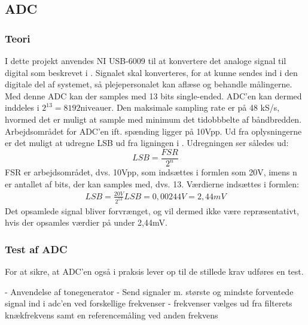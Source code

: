 \subsection{ADC}

\subsubsection{Teori}
I dette projekt anvendes NI USB-6009 til at konvertere det analoge signal til digital som beskrevet i . Signalet skal konverteres, for at kunne sendes ind i den digitale del af systemet, så plejepersonalet kan aflæse og behandle målingerne. Med denne ADC kan der samples med 13 bits single-ended. ADC'en kan dermed inddeles i $2^{13} = 8192 \text{niveauer}$. Den maksimale sampling rate er på 48 kS/s, hvormed det er muligt at sample med minimum det tidobbbelte af båndbredden. Arbejdsområdet for ADC'en ift. spænding ligger på 10Vpp. \cite{Instruments2014} Ud fra oplysningerne er det muligt at udregne LSB ud fra ligningen i . Udregningen ser således ud: \\
\begin{equation}
	LSB = \frac{FSR}{2^{n}} 
\end{equation}  
FSR er arbejdsområdet, dvs. 10Vpp, som indsættes i formlen som 20V, imens n er antallet af bits, der kan samples med, dvs. 13.
Værdierne indsættes i formlen: \\
\begin{align}
	LSB = \frac{20V}{2^{13}}
	LSB = 0,00244V = 2,44mV
\end{align}
Det opsamlede signal bliver forvrænget, og vil dermed ikke være repræsentativt, hvis der opsamles værdier på under 2,44mV. 

\subsubsection{Test af ADC}
For at sikre, at ADC'en også i praksis lever op til de stillede krav udføres en test.

- Anvendelse af tonegenerator
- Send signaler m. største og mindste forventede signal ind i adc'en ved forskellige frekvenser - frekvenser vælges ud fra filterets knækfrekvens samt en referencemåling ved anden frekvens